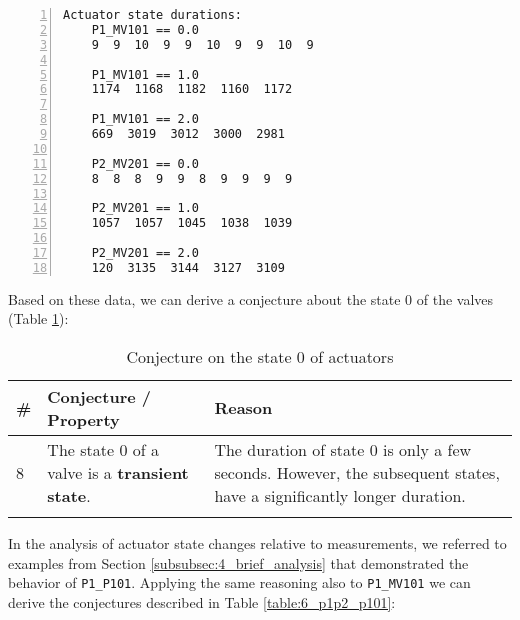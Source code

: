 \begin{lstlisting}[language=bash, numbers=left, caption=Time duration of the states of actuators MV101 and MV201 of PLC1-2, label=lst:6_preproc_P1P2_time]
	Actuator state durations:
	P1_MV101 == 0.0
	9  9  10  9  9  10  9  9  10  9
	
	P1_MV101 == 1.0
	1174  1168  1182  1160  1172
	
	P1_MV101 == 2.0
	669  3019  3012  3000  2981
	
	P2_MV201 == 0.0
	8  8  8  9  9  8  9  9  9  9
	
	P2_MV201 == 1.0
	1057  1057  1045  1038  1039
	
	P2_MV201 == 2.0
	120  3135  3144  3127  3109
\end{lstlisting}

\bigskip
\noindent Based on these data, we can derive a conjecture about the state 0 of the valves (Table \ref{table:6_p1p2_mvstate0}): 

{
	\small
	\begin{longtable}[l]{p{} p{} p{}}
		\hline
		\textbf{\#} & \textbf{Conjecture / Property} & \textbf{Reason} \\
		\hline
		
		8 & The state 0 of a valve is a \textbf{transient state}. & The duration of state 0 is only a few seconds. However, the subsequent states, have a significantly longer duration.\\
		\hline
		
	\caption{Conjecture on the state 0 of actuators}
	\label{table:6_p1p2_mvstate0}
\end{longtable}
}

\bigskip
In the analysis of actuator state changes relative to measurements, we referred to examples from Section \ref{subsubsec:4_brief_analysis} that demonstrated the behavior of \texttt{P1\_P101}. Applying the same reasoning also to \texttt{P1\_MV101} we can derive the conjectures described in Table \ref{table:6_p1p2_p101}:

